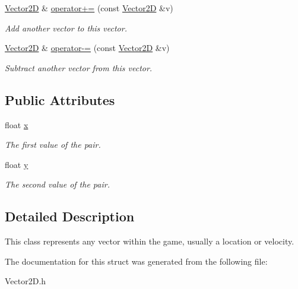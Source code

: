 \begin{DoxyCompactItemize}
\mbox{\hyperlink{struct_vector2_d}{Vector2D}} \& \mbox{\hyperlink{struct_vector2_d_af989648a18dc7969643c2b3471456638}{operator+=}} (const \mbox{\hyperlink{struct_vector2_d}{Vector2D}} \&v)
\begin{DoxyCompactList}\small\item\em Add another vector to this vector. \end{DoxyCompactList}\item 
\mbox{\label{struct_vector2_d_adcce8b472b92a395d86b091fb148f9ef}} 
\mbox{\hyperlink{struct_vector2_d}{Vector2D}} \& \mbox{\hyperlink{struct_vector2_d_adcce8b472b92a395d86b091fb148f9ef}{operator-\/=}} (const \mbox{\hyperlink{struct_vector2_d}{Vector2D}} \&v)
\begin{DoxyCompactList}\small\item\em Subtract another vector from this vector. \end{DoxyCompactList}\end{DoxyCompactItemize}
\subsection*{Public Attributes}
\begin{DoxyCompactItemize}
\item 
\mbox{\label{struct_vector2_d_aeb4253ba6555251d010ea4450619029e}} 
float \mbox{\hyperlink{struct_vector2_d_aeb4253ba6555251d010ea4450619029e}{x}}
\begin{DoxyCompactList}\small\item\em The first value of the pair. \end{DoxyCompactList}\item 
\mbox{\label{struct_vector2_d_a85215519d3f71d0e6be7d636346f3b7d}} 
float \mbox{\hyperlink{struct_vector2_d_a85215519d3f71d0e6be7d636346f3b7d}{y}}
\begin{DoxyCompactList}\small\item\em The second value of the pair. \end{DoxyCompactList}\end{DoxyCompactItemize}


\subsection{Detailed Description}
This class represents any vector within the game, usually a location or velocity. 

The documentation for this struct was generated from the following file\+:\begin{DoxyCompactItemize}
\item 
Vector2\+D.\+h\end{DoxyCompactItemize}
